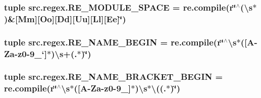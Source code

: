 \hypertarget{namespacesrc_1_1regex_aa2310cf0e6887261721930421ba8c5ea}{
\subsubsection[{R\-E\-\_\-\-M\-O\-D\-U\-L\-E\-\_\-\-S\-P\-A\-C\-E}]{\setlength{\rightskip}{0pt plus 5cm}tuple src.\-regex.\-R\-E\-\_\-\-M\-O\-D\-U\-L\-E\-\_\-\-S\-P\-A\-C\-E = re.\-compile(r\char`\"{}$^\wedge$(\textbackslash{}s$\ast$)\&\mbox{[}Mm\mbox{]}\mbox{[}Oo\mbox{]}\mbox{[}Dd\mbox{]}\mbox{[}Uu\mbox{]}\mbox{[}Ll\mbox{]}\mbox{[}Ee\mbox{]}\char`\"{})}}\label{namespacesrc_1_1regex_aa2310cf0e6887261721930421ba8c5ea}
\hypertarget{namespacesrc_1_1regex_a4369ef6cb68e6f8fd70ebad3d02c20e0}{
\subsubsection[{R\-E\-\_\-\-N\-A\-M\-E\-\_\-\-B\-E\-G\-I\-N}]{\setlength{\rightskip}{0pt plus 5cm}tuple src.\-regex.\-R\-E\-\_\-\-N\-A\-M\-E\-\_\-\-B\-E\-G\-I\-N = re.\-compile(r\char`\"{}$^\wedge$\textbackslash{}s$\ast$(\mbox{[}A-\/Za-\/z0-\/9\-\_\-`\mbox{]}$\ast$)\textbackslash{}s+(.$\ast$)\char`\"{})}}\label{namespacesrc_1_1regex_a4369ef6cb68e6f8fd70ebad3d02c20e0}
\hypertarget{namespacesrc_1_1regex_a9160a0c555a9af21f5143d56a010f364}{
\subsubsection[{R\-E\-\_\-\-N\-A\-M\-E\-\_\-\-B\-R\-A\-C\-K\-E\-T\-\_\-\-B\-E\-G\-I\-N}]{\setlength{\rightskip}{0pt plus 5cm}tuple src.\-regex.\-R\-E\-\_\-\-N\-A\-M\-E\-\_\-\-B\-R\-A\-C\-K\-E\-T\-\_\-\-B\-E\-G\-I\-N = re.\-compile(r\char`\"{}$^\wedge$\textbackslash{}s$\ast$(\mbox{[}A-\/Za-\/z0-\/9\-\_\-\mbox{]}$\ast$)\textbackslash{}s$\ast$\textbackslash{}((.$\ast$)\char`\"{})}}\label{namespacesrc_1_1regex_a9160a0c555a9af21f5143d56a010f364}
